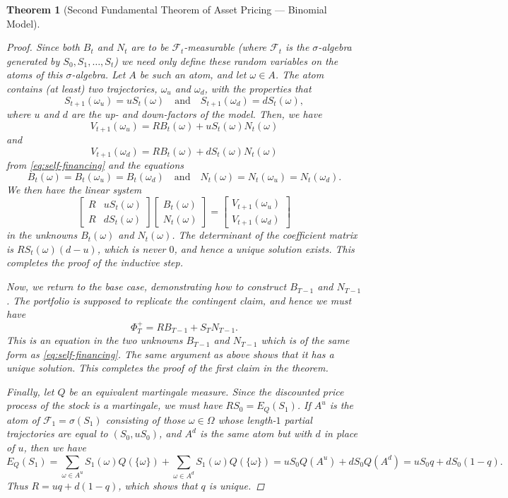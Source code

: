 \documentclass[11pt, openany, oneside]{book}
\newtheorem{thm}{Theorem}[section]
\theoremstyle{definition}
\theoremstyle{remark}
\theoremstyle{boldital}
\numberwithin{equation}{section}
\begin{document}
\begin{thm}[Second Fundamental Theorem of Asset Pricing --- Binomial Model]
\begin{proof}
Since both $B_t$ and $N_t$ are to be $\mathcal{F}_t$-measurable (where $\mathcal{F}_t$ is the $\sigma$-algebra generated by $S_0,S_1,\ldots,S_t$) we need only define these random variables on the atoms of this $\sigma$-algebra. Let $A$ be such an atom, and let $\omega \in A$. The atom contains (at least) two trajectories, $\omega_u$ and $\omega_d$, with the properties that
	\[
S_{t+1}(\omega_u) = u S_{t}(\omega) \quad \text{and} \quad S_{t+1}(\omega_d) = d S_{t}(\omega),
	\]
where $u$ and $d$ are the up- and down-factors of the model. Then, we have
	\[
	V_{t+1}(\omega_u) = R B_{t}(\omega) + uS_{t}(\omega) N_{t}(\omega)
	\]
and
	\[
	V_{t+1}(\omega_d) = R B_{t}(\omega) + dS_{t}(\omega) N_{t}(\omega)
	\]
from \eqref{eq:self-financing} and the equations
	\[B_t(\omega) = B_t(\omega_u) = B_t(\omega_d) \quad \text{and} \quad N_t(\omega) = N_t(\omega_u) = N_t(\omega_d).
	\]
We then have the linear system
	\begin{equation}\label{eq:linear-sys}
	\begin{bmatrix}
	R & uS_{t}(\omega) \\
	R & dS_{t}(\omega)
	\end{bmatrix}
	\begin{bmatrix} B_{t}(\omega) \\ N_{t}(\omega) \end{bmatrix} =
	\begin{bmatrix}
	V_{t+1}(\omega_u) \\
	V_{t+1}(\omega_d)
	\end{bmatrix}
	\end{equation}
in the unknowns $B_{t}(\omega)$ and $N_{t}(\omega)$. The determinant of the coefficient matrix is $RS_t(\omega)(d-u)$, which is never $0$, and hence a unique solution exists. This completes the proof of the inductive step.

Now, we return to the base case, demonstrating how to construct $B_{T-1}$ and $N_{T-1}$. The portfolio is supposed to replicate the contingent claim, and hence we must have
	\[
	\Phi^+_T = RB_{T-1} + S_T N_{T-1}.
	\]
This is an equation in the two unknowns $B_{T-1}$ and $N_{T-1}$ which is of the same form as \eqref{eq:self-financing}. The same argument as above shows that it has a unique solution. This completes the proof of the first claim in the theorem.

Finally, let $Q$ be an equivalent martingale measure. Since the discounted price process of the stock is a martingale, we must have $RS_0 = E_Q(S_1)$. If $A^u$ is the atom of $\mathcal{F}_1 = \sigma(S_1)$ consisting of those $\omega\in \Omega$ whose length-$1$ partial trajectories are equal to $(S_0,uS_0)$, and $A^d$ is the same atom but with $d$ in place of $u$, then we have
	\[
	E_Q(S_1) = \sum_{\omega\in A^u} S_1(\omega)Q(\{\omega\}) + \sum_{\omega\in A^d} S_1(\omega)Q(\{\omega\}) = uS_0 Q(A^u) + dS_0Q(A^d) = uS_0q + dS_0(1-q).
	\]
Thus $R = uq + d(1-q)$, which shows that $q$ is unique.
\end{proof}
\end{thm}
\end{document}
